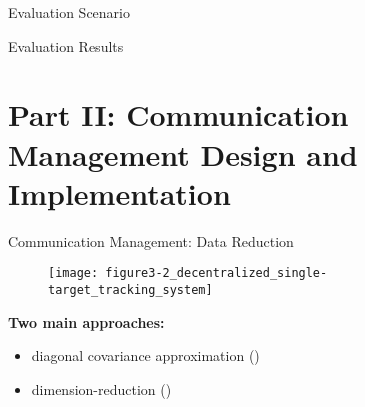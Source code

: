 \documentclass[aspectratio=1610]{beamer}
\begin{document}
\begin{frame}{Evaluation Scenario}

\begin{figure}
    \begin{tikzpicture}[scale=.5]
        
    \end{tikzpicture}
\end{figure}

\end{frame}


\begin{frame}{Evaluation Results}

\begin{figure}
    \begin{tikzpicture}[xscale=.25,yscale=1.2]
        
    \end{tikzpicture}
\end{figure}

\end{frame}






\section{Part II: Communication Management Design and Implementation}


\begin{frame}{Communication Management: Data Reduction}

\begin{figure}
    \texttt{[image: figure3-2\_decentralized\_single-target\_tracking\_system]}
\end{figure}

\textbf{Two main approaches:}
\begin{itemize}
    \item diagonal covariance approximation (\abbrDCA)
    \item dimension-reduction (\abbrDR)
\end{itemize}

\end{frame}
\end{document}
